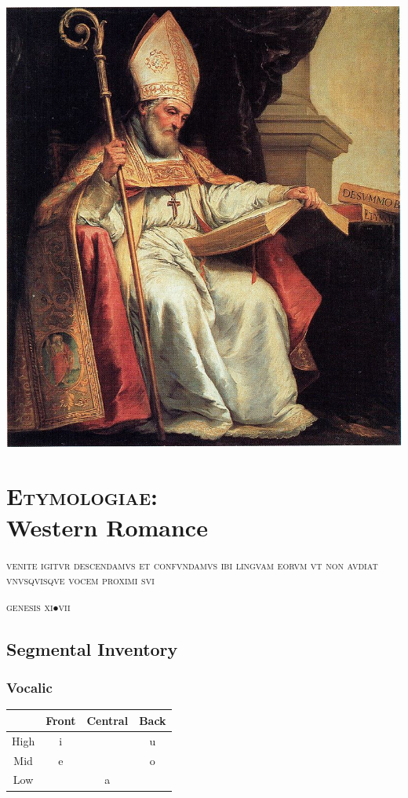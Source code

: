 \documentclass{report}[12pt]
\begin{document}
\includegraphics[scale=5.0]{isidorus.jpeg}

\thispagestyle{empty}

\pagebreak

\chapter{\textsc{Etymologiae}: \\ Western Romance}\label{cap:western_romance}

\epigraph{\textsc{venite igitvr descendamvs et confvndamvs ibi lingvam eorvm vt non avdiat vnvsqvisqve vocem proximi svi}}{\textsc{genesis} \textsc{xi}$\bullet$\textsc{vii}}

\section{Segmental Inventory}

\subsection{Vocalic}

\begin{tcolorbox}[title=Western Romance Monophthongs, hbox]
  \begin{tabular}{|c|c|c|c|}
    \hline
    & Front & Central & Back \\
    \hline
    High & i & & u \\
    \hline
    Mid & e & & o \\
    \hline
    Low & & a & \\
    \hline
  \end{tabular}
\end{tcolorbox}
\end{document}
